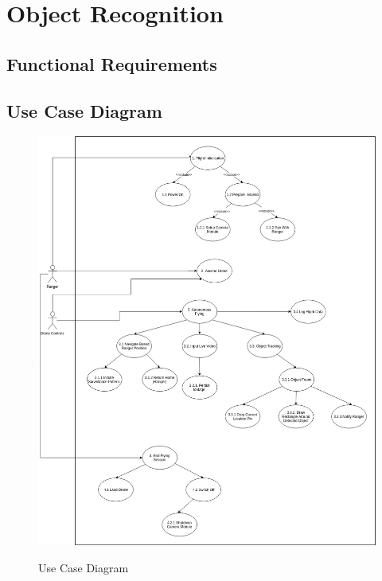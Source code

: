 \section{ Object Recognition }
\subsection{Functional Requirements}
	\begin{flushleft}
	\end{flushleft}


\subsection{Use Case Diagram}

	\begin{figure}[h!]
		\centering
		\includegraphics[scale=0.35]{./assets/images/uc-diagram-1.jpg}
		\label{fig: use-case-diagram}
		\caption{Use Case Diagram}
	\end{figure}



